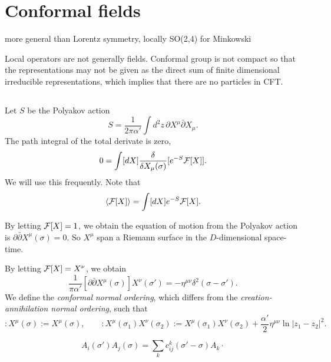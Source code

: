 \documentclass{../../large}
\begin{document}
\chapter{Conformal fields}
more general than Lorentz symmetry, locally SO(2,4) for Minkowski

Local operators are not generally fields.
Conformal group is not compact so that the representations may not be given as the direct sum of finite dimensional irreducible representations, which implies that there are no particles in CFT.





\section{}

\begin{prb}
Let $S$ be the Polyakov action
\[S=\frac1{2\pi\alpha'}\int d^2z\,\partial X^\mu\bar\partial X_\mu.\]
The path integral of the total derivate is zero,
\[0=\int[dX]\frac\delta{\delta X_\mu(\sigma)}[e^{-S}\mathcal{F}[X]].\]
We will use this frequently.
Note that
\[\langle\mathcal{F}[X]\rangle=\int[dX]e^{-S}\mathcal{F}[X].\]
\begin{parts}
\item By letting $\mathcal{F}[X]=1$, we obtain the equation of motion from the Polyakov action is $\partial\bar\partial X^\mu(\sigma)=0$.
So $X^\mu$ span a Riemann surface in the $D$-dimensional space-time.
\item By letting $\mathcal{F}[X]=X^\nu$, we obtain
\[\frac1{\pi\alpha'}[\partial\bar\partial X^\mu(\sigma)]X^\nu(\sigma')=-\eta^{\mu\nu}\delta^2(\sigma-\sigma').\]
We define the \emph{conformal normal ordering}, which differs from the \emph{creation-annihilation normal ordering}, such that
\[:X^\mu(\sigma):=X^\mu(\sigma),\qquad:X^\mu(\sigma_1)X^\nu(\sigma_2):=X^\mu(\sigma_1)X^\nu(\sigma_2)+\frac{\alpha'}2\eta^{\mu\nu}\ln|z_1-z_2|^2.\]
\end{parts}	
\end{prb}


\begin{prb}
\[A_i(\sigma')A_j(\sigma)=\sum_k c^k_{ij}(\sigma'-\sigma)A_k\cdot\]
\end{prb}
\end{document}
